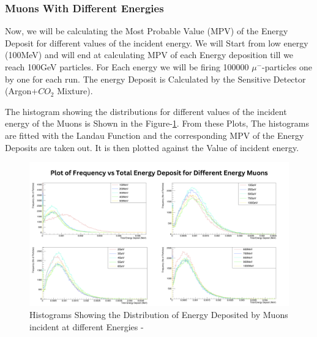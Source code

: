 \documentclass{article}
\begin{document}
\begin{multicols}{2}
\subsubsection{Muons With Different Energies}

Now, we will be calculating the Most Probable Value (MPV) of the
Energy Deposit for different values of the incident energy. We will Start 
from low energy (100MeV) and will end at calculating MPV of each Energy deposition
till we reach 100GeV particles. For Each energy we will be firing 100000 $\mu^-$-particles
one by one for each run. The energy Deposit is Calculated by the Sensitive Detector 
(Argon+$CO_2$ Mixture). 




The histogram showing the distributions for different values of the incident
energy of the Muons is Shown in the Figure-\ref{multihist}. From these Plots, The histograms 
are fitted with the Landau Function and the corresponding MPV of the Energy Deposits are taken out.
It is then plotted against the Value of incident energy.

\begin{figure}[ht]
    \centering	
     \includegraphics[width=1.9\columnwidth]{multihist.png}
     \caption{Histograms Showing the Distribution of Energy Deposited by Muons incident at different Energies -\cite{ROOT}}
     \label{multihist}
\end{figure}























\end{multicols}


\end{document}
